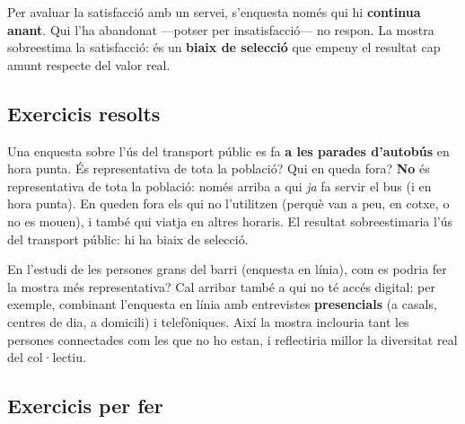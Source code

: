 \begin{exemple}
Per avaluar la satisfacció amb un servei, s'enquesta només qui hi \textbf{continua anant}.
Qui l'ha abandonat —potser per insatisfacció— no respon. La mostra sobreestima la
satisfacció: és un \textbf{biaix de selecció} que empeny el resultat cap amunt respecte del
valor real.
\end{exemple}

\subsection{Exercicis resolts}

\begin{exresolt}
Una enquesta sobre l'ús del transport públic es fa \textbf{a les parades d'autobús} en
hora punta. És representativa de tota la població? Qui en queda fora?
\solucio
\textbf{No} és representativa de tota la població: només arriba a qui \emph{ja} fa servir
el bus (i en hora punta). En queden fora els qui no l'utilitzen (perquè van a peu, en
cotxe, o no es mouen), i també qui viatja en altres horaris. El resultat sobreestimaria
l'ús del transport públic: hi ha biaix de selecció.
\end{exresolt}

\begin{exresolt}
En l'estudi de les persones grans del barri (enquesta en línia), com es podria fer la
mostra més representativa?
\solucio
Cal arribar també a qui no té accés digital: per exemple, combinant l'enquesta en línia
amb entrevistes \textbf{presencials} (a casals, centres de dia, a domicili) i telefòniques.
Així la mostra inclouria tant les persones connectades com les que no ho estan, i
reflectiria millor la diversitat real del col·lectiu.
\end{exresolt}

\subsection{Exercicis per fer}

